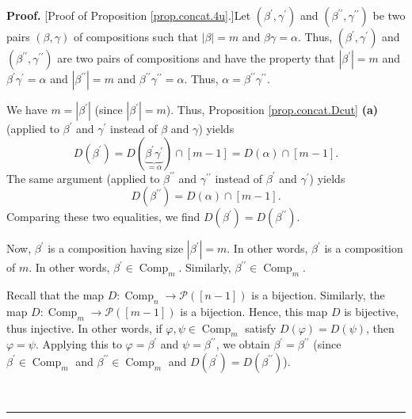 \documentclass[numbers=enddot,12pt,final,onecolumn,notitlepage]{scrartcl}%
\theoremstyle{definition}
\newenvironment{proof}[1][Proof]{\noindent\textbf{#1.} }{\ \rule{0.5em}{0.5em}}
\begin{document}
\begin{proof}
[Proof of Proposition \ref{prop.concat.4u}.]Let $\left(  \beta^{\prime}%
,\gamma^{\prime}\right)  $ and $\left(  \beta^{\prime\prime},\gamma
^{\prime\prime}\right)  $ be two pairs $\left(  \beta,\gamma\right)  $ of
compositions such that $\left\vert \beta\right\vert =m$ and $\beta
\gamma=\alpha$. Thus, $\left(  \beta^{\prime},\gamma^{\prime}\right)  $ and
$\left(  \beta^{\prime\prime},\gamma^{\prime\prime}\right)  $ are two pairs of
compositions and have the property that $\left\vert \beta^{\prime}\right\vert
=m$ and $\beta^{\prime}\gamma^{\prime}=\alpha$ and $\left\vert \beta
^{\prime\prime}\right\vert =m$ and $\beta^{\prime\prime}\gamma^{\prime\prime
}=\alpha$. Thus, $\alpha=\beta^{\prime\prime}\gamma^{\prime\prime}$.

We have $m=\left\vert \beta^{\prime}\right\vert $ (since $\left\vert
\beta^{\prime}\right\vert =m$). Thus, Proposition \ref{prop.concat.Dcut}
\textbf{(a)} (applied to $\beta^{\prime}$ and $\gamma^{\prime}$ instead of
$\beta$ and $\gamma$) yields
\[
D\left(  \beta^{\prime}\right)  =D\left(  \underbrace{\beta^{\prime}%
\gamma^{\prime}}_{=\alpha}\right)  \cap\left[  m-1\right]  =D\left(
\alpha\right)  \cap\left[  m-1\right]  .
\]
The same argument (applied to $\beta^{\prime\prime}$ and $\gamma^{\prime
\prime}$ instead of $\beta^{\prime}$ and $\gamma^{\prime}$) yields
\[
D\left(  \beta^{\prime\prime}\right)  =D\left(  \alpha\right)  \cap\left[
m-1\right]  .
\]
Comparing these two equalities, we find $D\left(  \beta^{\prime}\right)
=D\left(  \beta^{\prime\prime}\right)  $.

Now, $\beta^{\prime}$ is a composition having size $\left\vert \beta^{\prime
}\right\vert =m$. In other words, $\beta^{\prime}$ is a composition of $m$. In
other words, $\beta^{\prime}\in\operatorname*{Comp}\nolimits_{m}$. Similarly,
$\beta^{\prime\prime}\in\operatorname*{Comp}\nolimits_{m}$.

Recall that the map $D:\operatorname*{Comp}\nolimits_{n}\rightarrow
\mathcal{P}\left(  \left[  n-1\right]  \right)  $ is a bijection. Similarly,
the map $D:\operatorname*{Comp}\nolimits_{m}\rightarrow\mathcal{P}\left(
\left[  m-1\right]  \right)  $ is a bijection. Hence, this map $D$ is
bijective, thus injective. In other words, if $\varphi,\psi\in
\operatorname*{Comp}\nolimits_{m}$ satisfy $D\left(  \varphi\right)  =D\left(
\psi\right)  $, then $\varphi=\psi$. Applying this to $\varphi=\beta^{\prime}$
and $\psi=\beta^{\prime\prime}$, we obtain $\beta^{\prime}=\beta^{\prime
\prime}$ (since $\beta^{\prime}\in\operatorname*{Comp}\nolimits_{m}$ and
$\beta^{\prime\prime}\in\operatorname*{Comp}\nolimits_{m}$ and $D\left(
\beta^{\prime}\right)  =D\left(  \beta^{\prime\prime}\right)  $).


\end{proof}
\end{document}

